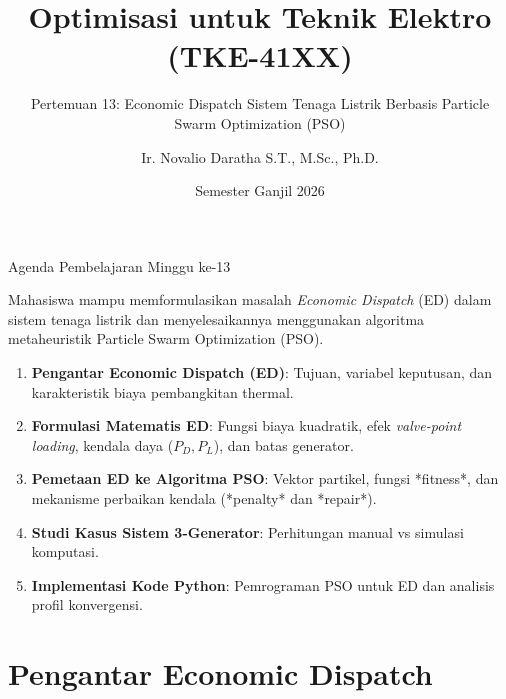 \documentclass[10pt,aspectratio=169]{beamer}
\title[Optimisasi TE: Pertemuan 13]{Optimisasi untuk Teknik Elektro (TKE-41XX)}
\subtitle{Pertemuan 13: Economic Dispatch Sistem Tenaga Listrik Berbasis Particle Swarm Optimization (PSO)}
\author[N. Daratha]{Ir. Novalio Daratha S.T., M.Sc., Ph.D.}
\institute[Teknik Elektro UNIB]{Program Studi S1 Teknik Elektro\\Fakultas Teknik - Universitas Bengkulu}
\date{Semester Ganjil 2026}
\begin{document}
\begin{frame}
    \titlepage
\end{frame}

\begin{frame}{Agenda Pembelajaran Minggu ke-13}
    \begin{tcolorbox}[colback=unibblue!5,colframe=unibblue,title=\textbf{Tujuan Pembelajaran (CPMK-3 \& CPMK-5)}]
        Mahasiswa mampu memformulasikan masalah \textit{Economic Dispatch} (ED) dalam sistem tenaga listrik dan menyelesaikannya menggunakan algoritma metaheuristik Particle Swarm Optimization (PSO).
    \end{tcolorbox}

    \vspace{0.3cm}
    \begin{enumerate}
        \item \textbf{Pengantar Economic Dispatch (ED)}: Tujuan, variabel keputusan, dan karakteristik biaya pembangkitan thermal.
        \item \textbf{Formulasi Matematis ED}: Fungsi biaya kuadratik, efek \textit{valve-point loading}, kendala daya ($P_D, P_L$), dan batas generator.
        \item \textbf{Pemetaan ED ke Algoritma PSO}: Vektor partikel, fungsi *fitness*, dan mekanisme perbaikan kendala (*penalty* dan *repair*).
        \item \textbf{Studi Kasus Sistem 3-Generator}: Perhitungan manual vs simulasi komputasi.
        \item \textbf{Implementasi Kode Python}: Pemrograman PSO untuk ED dan analisis profil konvergensi.
    \end{enumerate}
\end{frame}

\section{Pengantar Economic Dispatch}
\end{document}
